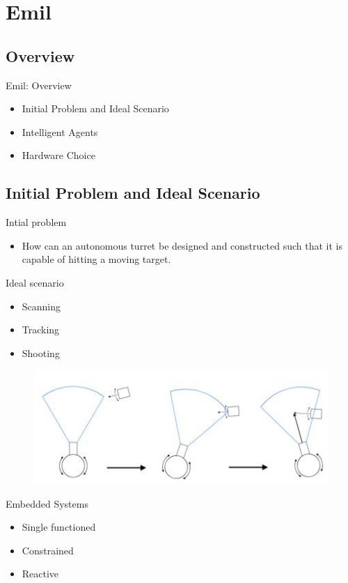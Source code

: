 \section{Emil}
\subsection{Overview}
\begin{frame}{Emil: Overview}
\begin{itemize}
  \item Initial Problem and Ideal Scenario
  \item Intelligent Agents
  \item Hardware Choice
\end{itemize}
\end{frame}
 
\subsection{Initial Problem and Ideal Scenario}
\begin{frame}{Intial problem}
\begin{itemize}
\item How can an autonomous turret be designed and constructed such
that it is capable of hitting a moving target.
\end{itemize}
\end{frame}

\begin{frame}{Ideal scenario}
\begin{itemize}
  \item Scanning
  \item Tracking
  \item Shooting
\end{itemize}
\begin{figure}[H]
  \includegraphics[scale=0.6]{figures/ideal.JPG}
\end{figure}
\end{frame}

\begin{frame}{Embedded Systems}
\begin{itemize}
  \item Single functioned
  \item Constrained
  \item Reactive
\end{itemize}
\end{frame}

